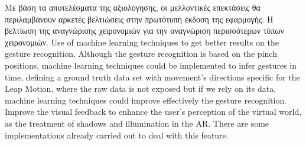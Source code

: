 Με βάση τα αποτελέσματα της αξιολόγησης, οι μελλοντικές επεκτάσεις θα περιλαμβάνουν αρκετές βελτιώσεις στην πρωτότυπη έκδοση της εφαρμογής. Η βελτίωση της αναγνώρισης χειρονομιών για την αναγνώριση περισσότερων τύπων χειρονομιών. Use of machine learning techniques to get better results on the gesture recognition. Although the gesture recognition is based on the pinch positions, machine learning techniques could be implemented to infer gestures in time, defining a ground truth data set with movement’s directions specific for the Leap Motion, where the raw data is not exposed but if we rely on its data, machine learning techniques could improve effectively the gesture recognition. Improve the visual feedback to enhance the user’s perception of the virtual world, as the treatment of shadows and illumination in the AR. There are some implementations already carried out to deal with this feature.



